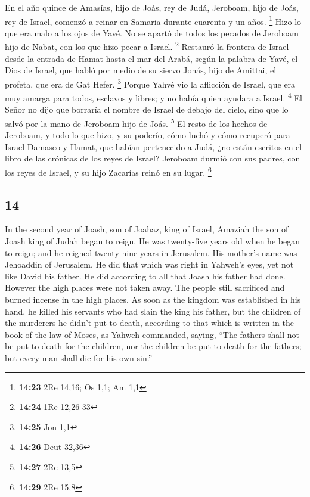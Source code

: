 \begin{paracol}{2}
 En el año quince de Amasías, hijo de Joás, rey de Judá,
Jeroboam, hijo de Joás, rey de Israel, comenzó a reinar en Samaria
durante cuarenta y un años. \footnote{\textbf{14:23} 2Re 14,16; Os 1,1;
  Am 1,1}  Hizo lo que era malo a los ojos de Yavé. No se
apartó de todos los pecados de Jeroboam hijo de Nabat, con los que hizo
pecar a Israel. \footnote{\textbf{14:24} 1Re 12,26-33} 
Restauró la frontera de Israel desde la entrada de Hamat hasta el mar
del Arabá, según la palabra de Yavé, el Dios de Israel, que habló por
medio de su siervo Jonás, hijo de Amittai, el profeta, que era de Gat
Hefer. \footnote{\textbf{14:25} Jon 1,1}  Porque Yahvé
vio la aflicción de Israel, que era muy amarga para todos, esclavos y
libres; y no había quien ayudara a Israel. \footnote{\textbf{14:26} Deut
  32,36}  El Señor no dijo que borraría el nombre de
Israel de debajo del cielo, sino que lo salvó por la mano de Jeroboam
hijo de Joás. \footnote{\textbf{14:27} 2Re 13,5}  El
resto de los hechos de Jeroboam, y todo lo que hizo, y su poderío, cómo
luchó y cómo recuperó para Israel Damasco y Hamat, que habían
pertenecido a Judá, ¿no están escritos en el libro de las crónicas de
los reyes de Israel?  Jeroboam durmió con sus padres, con
los reyes de Israel, y su hijo Zacarías reinó en su lugar. \footnote{\textbf{14:29}
  2Re 15,8}

\switchcolumn
\begin{otherlanguage}{english}

\hypertarget{section-27}{%
\section{14}\label{section-27}}

 In the second year of Joash, son of Joahaz, king of
Israel, Amaziah the son of Joash king of Judah began to reign.
 He was twenty-five years old when he began to reign; and
he reigned twenty-nine years in Jerusalem. His mother's name was
Jehoaddin of Jerusalem.  He did that which was right in
Yahweh's eyes, yet not like David his father. He did according to all
that Joash his father had done.  However the high places
were not taken away. The people still sacrificed and burned incense in
the high places.  As soon as the kingdom was established
in his hand, he killed his servants who had slain the king his father,
 but the children of the murderers he didn't put to death,
according to that which is written in the book of the law of Moses, as
Yahweh commanded, saying, ``The fathers shall not be put to death for
the children, nor the children be put to death for the fathers; but
every man shall die for his own sin.''


\end{otherlanguage}
\end{paracol}
